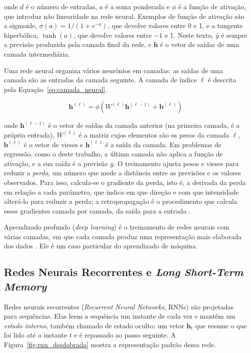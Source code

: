 \noindent onde \(d\) é o número de entradas, \(a\) é a soma ponderada e \(\phi\) é a função de ativação, que introduz não linearidade na rede neural. Exemplos de função de ativação são a sigmoide, \(\sigma(a)=1/(1+e^{-a})\), que devolve valores entre 0 e 1, e a tangente hiperbólica, \(\tanh(a)\), que devolve valores entre \(-1\) e 1. Neste texto, \(\hat{y}\) é sempre a previsão produzida pela camada final da rede, e \(\mathbf{h}\) é o vetor de saídas de uma camada intermediária.

Uma rede neural organiza vários neurônios em camadas: as saídas de uma camada são as entradas da camada seguinte. A camada de índice \(\ell\) é descrita pela Equação~\ref{eq:camada_neural}.

\begin{equation}
    \mathbf{h}^{(\ell)}
    =
    \phi\left(
        W^{(\ell)}\mathbf{h}^{(\ell-1)}
        +
        \mathbf{b}^{(\ell)}
    \right)
    \label{eq:camada_neural}
\end{equation}

\noindent onde \(\mathbf{h}^{(\ell-1)}\) é o vetor de saídas da camada anterior (na primeira camada, é a própria entrada), \(W^{(\ell)}\) é a matriz cujos elementos são os pesos da camada \(\ell\), \(\mathbf{b}^{(\ell)}\) é o vetor de vieses e \(\mathbf{h}^{(\ell)}\) é a saída da camada. Em problemas de regressão, como o deste trabalho, a última camada não aplica a função de ativação, e a sua saída é a previsão \(\hat{y}\). O treinamento ajusta pesos e vieses para reduzir a \emph{perda}, um número que mede a distância entre as previsões e os valores observados. Para isso, calcula-se o gradiente da perda, isto é, a derivada da perda em relação a cada parâmetro, que indica em que direção e com que intensidade alterá-lo para reduzir a perda; a retropropagação é o procedimento que calcula esses gradientes camada por camada, da saída para a entrada \cite{goodfellow2016deep}.

Aprendizado profundo (\textit{deep learning}) é o treinamento de redes neurais com várias camadas, em que cada camada produz uma representação mais elaborada dos dados \cite{goodfellow2016deep,lecun2015deep}. Ele é um caso particular do aprendizado de máquina.

\subsection{Redes Neurais Recorrentes e \textit{Long Short-Term Memory}}
\label{sec:rnn_lstm}

Redes neurais recorrentes (\textit{Recurrent Neural Networks}, RNNs) são projetadas para sequências. Elas leem a sequência um instante de cada vez e mantêm um \emph{estado interno}, também chamado de estado oculto: um vetor \(\mathbf{h}_t\) que resume o que foi lido até o instante \(t\) e é repassado ao passo seguinte. A Figura~\ref{fig:rnn_desdobrada} mostra a representação padrão dessa rede.

